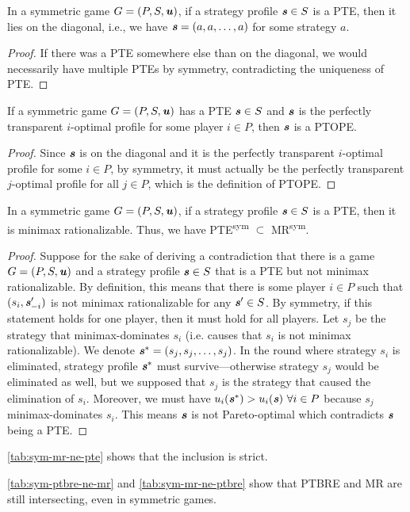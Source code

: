 \begin{observation}
	 In a symmetric game $G = (P, S, \boldsymbol{\mathit{u}})$, if a strategy profile $\boldsymbol{\mathit{s}} \in S$ is a PTE, then it lies on the diagonal, i.e., we have $\boldsymbol{\mathit{s}} = (a, a, \dots, a)$ for some strategy $a$.
\end{observation}

\begin{proof}
	If there was a PTE somewhere else than on the diagonal, we would necessarily have multiple PTEs by symmetry, contradicting the uniqueness of PTE.
\end{proof}

\begin{corollary}
	If a symmetric game $G = (P, S, \boldsymbol{\mathit{u}})$ has a PTE $\boldsymbol{\mathit{s}} \in S$ and $\boldsymbol{\mathit{s}}$ is the perfectly transparent $i$-optimal profile for some player $i \in P$, then $\boldsymbol{\mathit{s}}$ is a PTOPE. 
\end{corollary}

\begin{proof}
	Since $\boldsymbol{\mathit{s}}$ is on the diagonal and it is the perfectly transparent $i$-optimal profile for some $i \in P$, by symmetry, it must actually be the perfectly transparent $j$-optimal profile for all $j \in P$, which is the definition of PTOPE.
\end{proof}

\begin{lemma}
	In a symmetric game $G = (P, S, \boldsymbol{\mathit{u}})$, if a strategy profile $\boldsymbol{\mathit{s}} \in S$ is a PTE, then it is minimax rationalizable.
	Thus, we have PTE\textsuperscript{sym} $\subset$ MR\textsuperscript{sym}.
\end{lemma}

\begin{proof}
	Suppose for the sake of deriving a contradiction that there is a game $G = (P, S, \boldsymbol{\mathit{u}})$ and a strategy profile $\boldsymbol{\mathit{s}} \in S$ that is a PTE but not minimax rationalizable.
	By definition, this means that there is some player $i \in P$ such that $(s_i, \boldsymbol{\mathit{s}}_{-i}')$ is not minimax rationalizable for any $\boldsymbol{\mathit{s}}' \in S$.
	By symmetry, if this statement holds for one player, then it must hold for all players.
	Let $s_j$ be the strategy that minimax-dominates $s_i$ (i.e. causes that $s_i$ is not minimax rationalizable).
	We denote $\boldsymbol{\mathit{s}}^* = (s_j, s_j, \dots, s_j)$.
	In the round where strategy $s_i$ is eliminated, strategy profile $\boldsymbol{\mathit{s}}^*$ must survive---otherwise strategy $s_j$ would be eliminated as well, but we supposed that $s_j$ is the strategy that caused the elimination of $s_i$.
	Moreover, we must have $u_i(\boldsymbol{\mathit{s}}^*) > u_i(\boldsymbol{\mathit{s}})\ \forall i \in P$ because $s_j$ minimax-dominates $s_i$.
	This means $\boldsymbol{\mathit{s}}$ is not Pareto-optimal which contradicts $\boldsymbol{\mathit{s}}$ being a PTE.
\end{proof}

\begin{remark}
	\autoref{tab:sym-mr-ne-pte} shows that the inclusion is strict.
\end{remark}

\begin{remark}
	\autoref{tab:sym-ptbre-ne-mr} and \autoref{tab:sym-mr-ne-ptbre} show that PTBRE and MR are still intersecting, even in symmetric games.
\end{remark}
